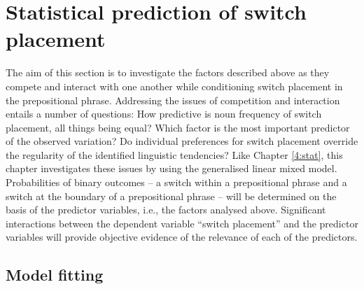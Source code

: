\section{Statistical prediction of switch placement}

\noindent The aim of this section is to investigate the factors described above as they compete and interact with one another while conditioning switch placement in the prepositional phrase. Addressing the issues of competition and interaction entails a number of questions: How predictive is noun frequency of switch placement, all things being equal? Which factor is the most important predictor of the observed variation? Do individual preferences for switch placement override the regularity of the identified linguistic tendencies? Like Chapter \ref{4:stat}, this chapter investigates these issues by using the generalised linear mixed model. Probabilities of binary outcomes -- a switch within a prepositional phrase and a switch at the boundary of a prepositional phrase -- will be determined on the basis of the predictor variables, i.e., the factors analysed above. Significant interactions between the dependent variable “switch placement” and the predictor variables will provide objective evidence of the relevance of each of the predictors.

\subsection{Model fitting}

